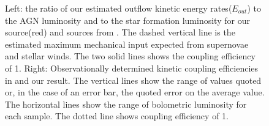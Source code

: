 \documentclass{subfiles}
\begin{document}
	\begin{figure}[htp]
		\centering
		\label{coupeffic}
		\caption{Left: the ratio of our estimated outflow kinetic energy rates($E_{out}$) to the AGN luminosity and to the star formation luminosity for our source(red) and sources from \citet{harrison2014kiloparsec}. The dashed vertical line is the estimated maximum mechanical input expected from supernovae and stellar winds. The two solid lines shows the coupling efficiency of 1. Right: Observationally determined kinetic coupling efficiencies in \citet{harrison2018agn} and our result. The vertical lines show the range of values quoted or, in the case of an error bar, the quoted error on the average value. The horizontal lines show the range of bolometric luminosity for each sample. The dotted line shows coupling efficiency of 1. }
	\end{figure}
	
\end{document}
